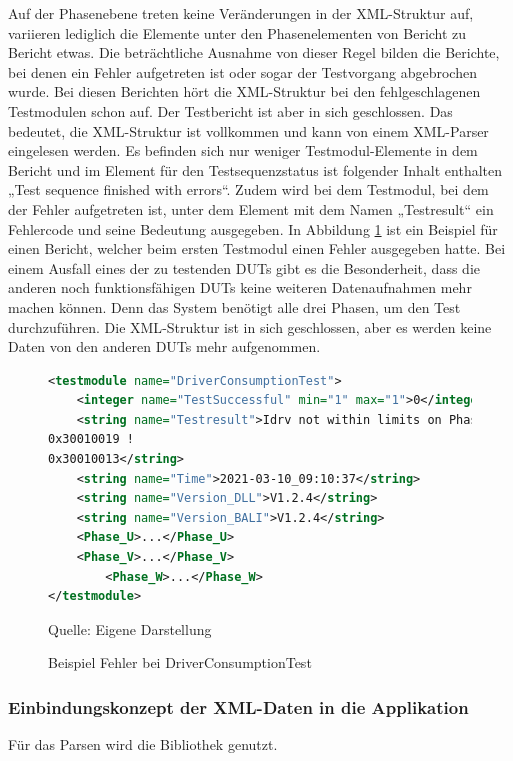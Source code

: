 Auf der Phasenebene treten keine Veränderungen in der \ac{XML}-Struktur auf, variieren lediglich die Elemente unter den
Phasenelementen von Bericht zu Bericht etwas.
Die beträchtliche Ausnahme von dieser Regel bilden die Berichte, bei denen ein Fehler aufgetreten ist oder sogar der
Testvorgang abgebrochen wurde. Bei diesen Berichten hört die \ac{XML}-Struktur bei den fehlgeschlagenen Testmodulen schon auf.
Der Testbericht ist aber in sich geschlossen. Das bedeutet, die \ac{XML}-Struktur ist vollkommen und kann von einem \ac{XML}-Parser eingelesen werden.
Es befinden sich nur weniger Testmodul-Elemente in dem Bericht und im Element für den Testsequenzstatus ist folgender Inhalt
enthalten „Test sequence finished with errors“. Zudem wird bei dem Testmodul, bei dem der Fehler aufgetreten ist, unter
dem Element mit dem Namen „Testresult“ ein Fehlercode und seine Bedeutung ausgegeben. In Abbildung \ref{fig: Beispiel Fehler bei DriverConsumptionTest} ist ein
Beispiel für einen Bericht, welcher beim ersten Testmodul einen Fehler ausgegeben hatte.
Bei einem Ausfall eines der zu testenden \ac{DUTs} gibt es die Besonderheit, dass die anderen noch funktionsfähigen \ac{DUTs}
keine weiteren Datenaufnahmen mehr machen können. Denn das System benötigt alle drei Phasen, um den Test durchzuführen.
Die \ac{XML}-Struktur ist in sich geschlossen, aber es werden keine Daten von den anderen \ac{DUTs} mehr aufgenommen.

\begin{figure}[H]
\centering
\begin{minipage}{0.95\textwidth}
\begin{lstlisting}[language=XML]
<testmodule name="DriverConsumptionTest">
	<integer name="TestSuccessful" min="1" max="1">0</integer>
	<string name="Testresult">Idrv not within limits on Phase U
0x30010019 !
0x30010013</string>
	<string name="Time">2021-03-10_09:10:37</string>
	<string name="Version_DLL">V1.2.4</string>
    <string name="Version_BALI">V1.2.4</string>
    <Phase_U>...</Phase_U>
    <Phase_V>...</Phase_V>
        <Phase_W>...</Phase_W>
</testmodule>
\end{lstlisting}
\end{minipage}
\caption{Beispiel Fehler bei DriverConsumptionTest}
\label{fig: Beispiel Fehler bei DriverConsumptionTest}
    {Quelle: Eigene Darstellung}
\end{figure}

\subsubsection{Einbindungskonzept der XML-Daten in die Applikation}

Für das Parsen wird die Bibliothek  genutzt.





